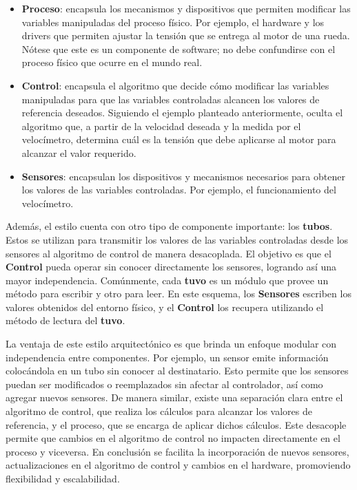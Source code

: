 \begin{itemize}
\item \textbf{Proceso}: encapsula los mecanismos y dispositivos que permiten modificar las variables manipuladas del proceso físico. Por ejemplo, el hardware y los drivers que permiten ajustar la tensión que se entrega al motor de una rueda. Nótese que este es un componente de software; no debe confundirse con el proceso físico que ocurre en el mundo real.

\item \textbf{Control}: encapsula el algoritmo que decide cómo modificar las variables manipuladas para que las variables controladas alcancen los valores de referencia deseados. Siguiendo el ejemplo planteado anteriormente, oculta el algoritmo que, a partir de la velocidad deseada y la medida por el velocímetro, determina cuál es la tensión que debe aplicarse al motor para alcanzar el valor requerido.

\item \textbf{Sensores}: encapsulan los dispositivos y mecanismos necesarios para obtener los valores de las variables controladas. Por ejemplo, el funcionamiento del velocímetro.
\end{itemize}

Además, el estilo cuenta con otro tipo de componente importante: los \textbf{tubos}. Estos se utilizan para transmitir los valores de las variables controladas desde los sensores al algoritmo de control de manera desacoplada. El objetivo es que el \textbf{Control} pueda operar sin conocer directamente los sensores, logrando así una mayor independencia. Comúnmente, cada \textbf{tuvo} es un módulo que provee un método para escribir y otro para leer. En este esquema, los \textbf{Sensores} escriben los valores obtenidos del entorno físico, y el \textbf{Control} los recupera utilizando el método de lectura del \textbf{tuvo}.


La ventaja de este estilo arquitectónico es que brinda un enfoque modular con independencia entre componentes. Por ejemplo, un sensor emite información colocándola en un tubo sin conocer al destinatario. Esto permite que los sensores puedan ser modificados o reemplazados sin afectar al controlador, así como agregar nuevos sensores. De manera similar, existe una separación clara entre el algoritmo de control, que realiza los cálculos para alcanzar los valores de referencia, y el proceso, que se encarga de aplicar dichos cálculos. Este desacople permite que cambios en el algoritmo de control no impacten directamente en el proceso y viceversa. En conclusión se facilita la incorporación de nuevos sensores, actualizaciones en el algoritmo de control y cambios en el hardware, promoviendo flexibilidad y escalabilidad.



